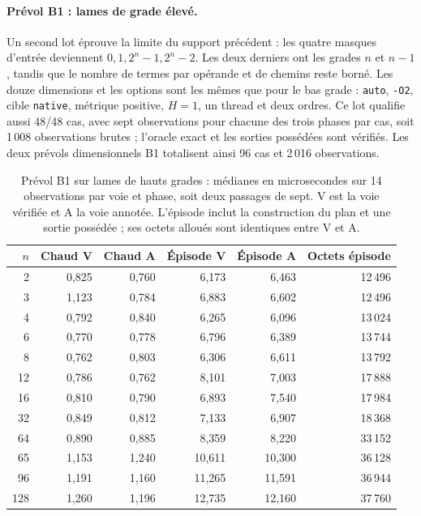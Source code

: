 \documentclass[11pt,a4paper]{article}
\newcommand{\code}[1]{\texttt{#1}}
\begin{document}
\paragraph{Prévol B1 : lames de grade élevé.}
Un second lot éprouve la limite du support précédent : les quatre
masques d'entrée deviennent $0,1,2^n-1,2^n-2$. Les deux derniers ont
les grades $n$ et $n-1$, tandis que le nombre de termes par opérande et
de chemins reste borné. Les douze dimensions et les options sont les
mêmes que pour le bas grade : \code{auto}, \code{-O2}, cible
\code{native}, métrique positive, $H=1$, un thread et deux ordres.
Ce lot qualifie aussi 48/48 cas, avec sept observations pour chacune
des trois phases par cas, soit 1\,008 observations brutes ; l'oracle
exact et les sorties possédées sont vérifiés. Les deux prévols dimensionnels
B1 totalisent ainsi 96 cas et 2\,016 observations.

\begin{table}[ht]
\centering\footnotesize
\begin{tabular}{@{}rrrrrr@{}}
\toprule
$n$ & Chaud V & Chaud A & Épisode V & Épisode A & Octets épisode \\
\midrule
2 & 0,825 & 0,760 & 6,173 & 6,463 & 12\,496 \\
3 & 1,123 & 0,784 & 6,883 & 6,602 & 12\,496 \\
4 & 0,792 & 0,840 & 6,265 & 6,096 & 13\,024 \\
6 & 0,770 & 0,778 & 6,796 & 6,389 & 13\,744 \\
8 & 0,762 & 0,803 & 6,306 & 6,611 & 13\,792 \\
12 & 0,786 & 0,762 & 8,101 & 7,003 & 17\,888 \\
16 & 0,810 & 0,790 & 6,893 & 7,540 & 17\,984 \\
32 & 0,849 & 0,812 & 7,133 & 6,907 & 18\,368 \\
64 & 0,890 & 0,885 & 8,359 & 8,220 & 33\,152 \\
65 & 1,153 & 1,240 & 10,611 & 10,300 & 36\,128 \\
96 & 1,191 & 1,160 & 11,265 & 11,591 & 36\,944 \\
128 & 1,260 & 1,196 & 12,735 & 12,160 & 37\,760 \\
\bottomrule
\end{tabular}
\caption{Prévol B1 sur lames de hauts grades : médianes en
microsecondes sur 14 observations par voie et phase, soit deux passages
de sept. V est la voie vérifiée et A la voie annotée. L'épisode inclut
la construction du plan et une sortie possédée ; ses octets alloués sont
identiques entre V et A.}
\label{tab:b1highgrade}
\end{table}
\end{document}
